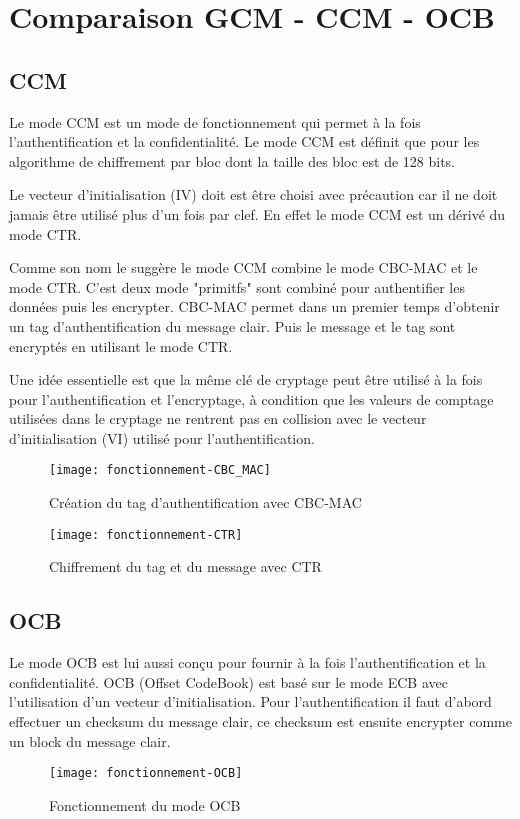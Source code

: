 \chapter{Comparaison GCM - CCM - OCB}

\section{CCM}

Le mode CCM est un mode de fonctionnement qui permet à la fois l'authentification et la confidentialité. Le mode CCM est définit que pour les algorithme de chiffrement par bloc dont la taille des bloc est de 128 bits.


Le vecteur d'initialisation (IV) doit est être choisi avec précaution car il ne doit jamais être utilisé plus d'un fois par clef. En effet le mode CCM est un dérivé du mode CTR.


Comme son nom le suggère le mode CCM combine le mode CBC-MAC et le mode CTR. C'est deux mode "primitfs" sont combiné pour authentifier les données puis les encrypter. CBC-MAC permet dans un premier temps d'obtenir un tag d'authentification du message clair. Puis le message et le tag sont encryptés en utilisant le mode CTR.


Une idée essentielle est que la même clé de cryptage peut être utilisé à la fois pour l'authentification et l'encryptage, à condition que les valeurs de comptage utilisées dans le cryptage ne rentrent pas en collision avec le vecteur d'initialisation (VI) utilisé pour l'authentification.


\begin{figure}[!h]
  \centering
  \texttt{[image: fonctionnement-CBC\_MAC]}
  \caption{Création du tag d'authentification avec CBC-MAC}
  \label{Création du tag d'authentification avec CBC-MAC}
\end{figure}

\begin{figure}[!h]
  \centering
  \texttt{[image: fonctionnement-CTR]}
  \caption{Chiffrement du tag et du message avec CTR}
  \label{Chiffrement du tag et du message avec CTR}
\end{figure}




\section{OCB}
Le mode OCB est lui aussi conçu pour fournir à la fois l'authentification et la confidentialité. OCB (Offset CodeBook) est basé sur le mode ECB avec l'utilisation d'un vecteur d'initialisation. Pour l'authentification il faut d'abord effectuer un checksum du message clair, ce checksum est ensuite encrypter comme un block du message clair. 

\begin{figure}[!h]
  \centering
  \texttt{[image: fonctionnement-OCB]}
  \caption{Fonctionnement du mode OCB}
  \label{Fonctionnement du mode OCB}
\end{figure}
